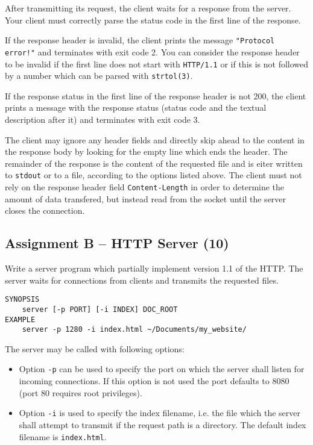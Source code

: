 After transmitting its request, the client waits for a response from the server.
Your client must correctly parse the status code
in the first line of the response.

If the response header is invalid,
the client prints the message \texttt{"Protocol error!"}
and terminates with exit code 2.
You can consider the response header to be invalid
if the first line does not start with \verb|HTTP/1.1|
or if this is not followed by a number
which can be parsed with \verb|strtol(3)|.

If the response status in the first line of the response header is not 200,
the client prints a message with the response status
(status code and the textual description after it)
and terminates with exit code 3.

The client may ignore any header fields
and directly skip ahead to the content in the response body
by looking for the empty line which ends the header.
The remainder of the response is the content of the requested file
and is eiter written to \verb|stdout| or to a file,
according to the options listed above.
The client must not rely on the response header field \verb|Content-Length|
in order to determine the amount of data transfered,
but instead read from the socket until the server closes the connection.


\subsection*{Assignment B -- HTTP Server (10)}

Write a server program
which partially implement version 1.1 of the HTTP.
The server waits for connections from clients
and transmits the requested files.

\vspace{-3mm}

\begin{verbatim}
SYNOPSIS
    server [-p PORT] [-i INDEX] DOC_ROOT
EXAMPLE
    server -p 1280 -i index.html ~/Documents/my_website/
\end{verbatim}

\vspace{-3mm}

The server may be called with following options:
\begin{itemize}
\item Option \texttt{-p} can be used to specify the port
on which the server shall listen for incoming connections.
If this option is not used the port defaults to 8080
(port 80 requires root privileges).
\item Option \texttt{-i} is used to specify the index filename,
i.e. the file which the server shall attempt to transmit
if the request path is a directory.
The default index filename is \verb|index.html|.
\end{itemize}

